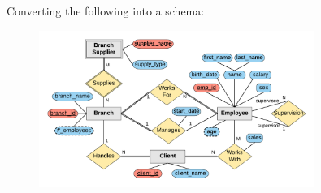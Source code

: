Converting the following into a schema:
\begin{figure}[H]
    \centering
    \includegraphics[width=0.8\textwidth]{./Figs/2020-12-24-22-51-10.png}
\end{figure}

